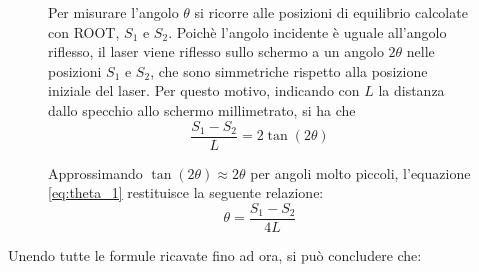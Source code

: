 \documentclass{article}
\begin{document}
\begin{figure}
    \begin{minipage}{0.48\textwidth}
        \centering
    \end{minipage}
    \hfill
    \begin{minipage}{0.48\textwidth}
        Per misurare l'angolo $\theta$ si ricorre alle posizioni di equilibrio calcolate con ROOT, $S_1$ e $S_2$. Poichè l'angolo incidente è uguale all'angolo riflesso, il laser viene riflesso sullo schermo a un angolo $2\theta$ nelle posizioni $S_1$ e $S_2$, che sono simmetriche rispetto alla posizione iniziale del laser. Per questo motivo, indicando con $L$ la distanza dallo specchio allo schermo millimetrato, si ha che
        \begin{equation}\label{eq:theta_1}
            \frac{S_1-S_2}{L}=2\tan(2\theta)
        \end{equation}
        
        Approssimando $\tan(2\theta) \approx 2\theta$ per angoli molto piccoli, l'equazione \eqref{eq:theta_1} restituisce la seguente relazione:
        \begin{equation}
            \theta = \frac{S_1-S_2}{4L}
        \end{equation}
    \end{minipage}
\end{figure}

Unendo tutte le formule ricavate fino ad ora, si può concludere che:
\end{document}
